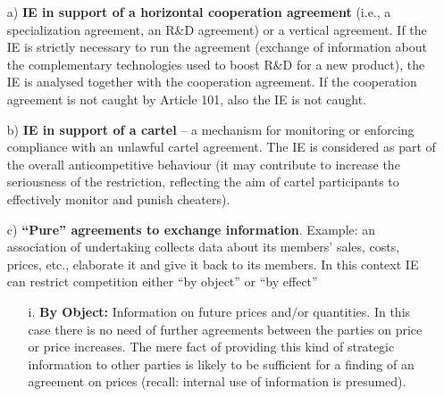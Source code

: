         \begin{enumerate}
            \item[a)] \textbf{IE in support of a horizontal cooperation agreement} (i.e., a specialization agreement, an R\&D agreement) or a vertical agreement. If the IE is strictly necessary to run the agreement (exchange of information about the complementary technologies used to boost R\&D for a new product), the IE is analysed together with the cooperation agreement. If the cooperation agreement is not caught by Article 101, also the IE is not caught.
            \item[b)] \textbf{IE in support of a cartel} – a mechanism for monitoring or enforcing compliance with an unlawful cartel agreement. The IE is considered as part of the overall anticompetitive behaviour (it may contribute to increase the seriousness of the restriction, reflecting the aim of cartel participants to effectively monitor and punish cheaters).
            \item[c)] \textbf{“Pure” agreements to exchange information}. Example: an association of undertaking collects data about its members’ sales, costs, prices, etc., elaborate it and give it back to its members. In this context IE can restrict competition either “by object” or “by effect”
                \begin{enumerate}
                    \item[i.] \textbf{By Object:} Information on future prices and/or quantities. In this case there is no need of further agreements between the parties on price or price increases. The mere fact of providing this kind of strategic information to other parties is likely to be sufficient for a finding of an agreement on prices (recall: internal use of information is presumed).
                    

\end{enumerate}
\end{enumerate}
